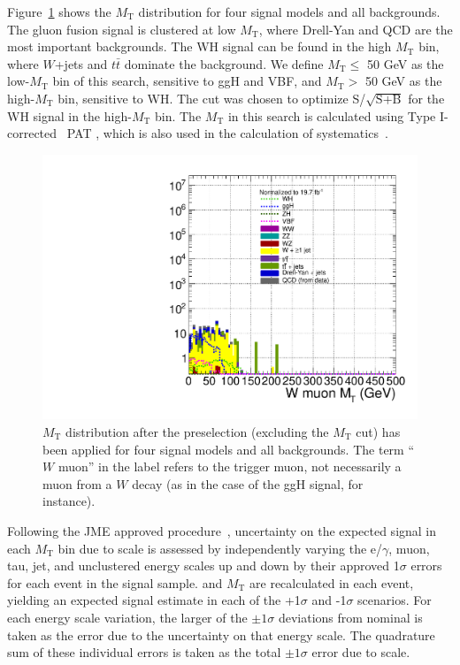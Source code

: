 Figure~\ref{fig:sigVsBkg_MET_MT_regA} shows the $M_{\text{T}}$ distribution for four signal models and all backgrounds.  The gluon fusion signal is clustered at low $M_{\text{T}}$, where Drell-Yan and QCD are the most important backgrounds.  The WH signal can be found in the high $M_{\text{T}}$ bin, where $W$+jets and $t\bar{t}$ dominate the background.  We define $M_{\text{T}} \le$ 50 GeV as the low-$M_{\text{T}}$ bin of this search, sensitive to ggH and VBF, and $M_{\text{T}} >$ 50 GeV as the high-$M_{\text{T}}$ bin, sensitive to WH.  The cut was chosen to optimize S/$\sqrt{\text{S} + \text{B}}$ for the WH signal in the high-$M_{\text{T}}$ bin.  The $M_{\text{T}}$ in this search is calculated using Type I-corrected~\cite{1748-0221-6-11-P11002} PAT \ETslash, which is also used in the calculation of \ETslash systematics~\cite{METuncertainty}.

\begin{figure}[hbtp]
  \begin{center}
    \includegraphics[width=1.2\cmsFigWidth]{figures/sigVsBkg_MT_regA_v62}
    \caption{$M_{\text{T}}$ distribution after the preselection (excluding the $M_{\text{T}}$ cut) has been applied for four signal models and all backgrounds. The term ``$W$ muon'' in the label refers to the trigger muon, not necessarily a muon from a $W$ decay (as in the case of the ggH signal, for instance).}
    \label{fig:sigVsBkg_MET_MT_regA}
  \end{center}
\end{figure}

Following the JME approved procedure~\cite{METuncertainty}, uncertainty on the expected signal in each $M_{\text{T}}$ bin due to \ETslash scale is assessed by independently varying the e/$\gamma$, muon, tau, jet, and unclustered energy scales up and down by their approved 1$\sigma$ errors for each event in the signal sample.  \ETslash and $M_{\text{T}}$ are recalculated in each event, yielding an expected signal estimate in each of the +1$\sigma$ and -1$\sigma$ scenarios.  For each energy scale variation, the larger of the $\pm1\sigma$ deviations from nominal is taken as the error due to the uncertainty on that energy scale.  The quadrature sum of these individual errors is taken as the total $\pm1\sigma$ error due to \ETslash scale.

